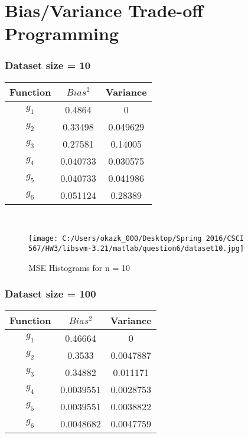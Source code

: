 \documentclass[letter,11pt]{article}
\begin{document}
\section{Bias/Variance Trade-off Programming}

\subsubsection{Dataset size = 10}

\begin{tabular}{|c| c |c |} 
	\hline
	Function & $Bias^2$ & Variance \\ [0.5ex] 			
	\hline
	$g_1$ & 0.4864  & 0 \\ [0.5ex] 
	\hline
	$g_2$ & 0.33498   & 0.049629  \\ 
	\hline
	$g_3$ &  0.27581   & 0.14005\\
	\hline
	$g_4$ & 0.040733    & 0.030575\\
	\hline
	$g_5$ & 0.040733  & 0.041986\\
	\hline
	$g_6$ &  0.051124 & 0.28389\\
	\hline
\end{tabular}\\
		
	\begin{figure}[H]%
	\centering
	\texttt{[image: C:/Users/okazk\_000/Desktop/Spring 2016/CSCI 567/HW3/libsvm-3.21/matlab/question6/dataset10.jpg]}
	\caption{MSE Histograms for n = 10}
	\label{fig:test}
	\end{figure}
	
\subsubsection{Dataset size = 100}
\begin{tabular}{|c| c |c |}
	\hline
	Function & $Bias^2$ & Variance \\ [0.5ex] 			
	\hline
	$g_1$ & 0.46664  & 0 \\ [0.5ex] 
	\hline
	$g_2$ & 0.3533   & 0.0047887  \\ 
	\hline
	$g_3$ &  0.34882   & 0.011171\\
	\hline
	$g_4$ & 0.0039551    & 0.0028753\\
	\hline
	$g_5$ & 0.0039551  & 0.0038822\\
	\hline
	$g_6$ &  0.0048682 & 0.0047759\\
	\hline
\end{tabular}\\
\end{document}
